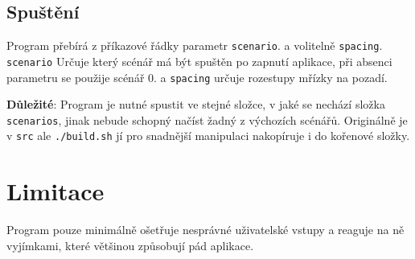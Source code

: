 \documentclass[12pt]{article}
\newcommand{\code}[1]{\texttt{#1}}
\begin{document}
\subsection{Spuštění}

Program přebírá z příkazové řádky parametr \code{scenario}. a volitelně
\code{spacing}. \code{scenario} Určuje který scénář má být spuštěn po zapnutí
aplikace, při absenci parametru se použije scénář 0. a \code{spacing} určuje
rozestupy mřízky na pozadí.

\textbf{Důležité}: Program je nutné spustit ve stejné složce, v jaké se nechází
složka \code{scenarios}, jinak nebude schopný načíst žadný z výchozích scénářů.
Originálně je v \code{src} ale \code{./build.sh} jí pro snadnější manipulaci 
nakopíruje i do kořenové složky.

\section{Limitace}

Program pouze minimálně ošetřuje nesprávné uživatelské vstupy a reaguje na ně
vyjímkami, které většinou způsobují pád aplikace. 
\end{document}
